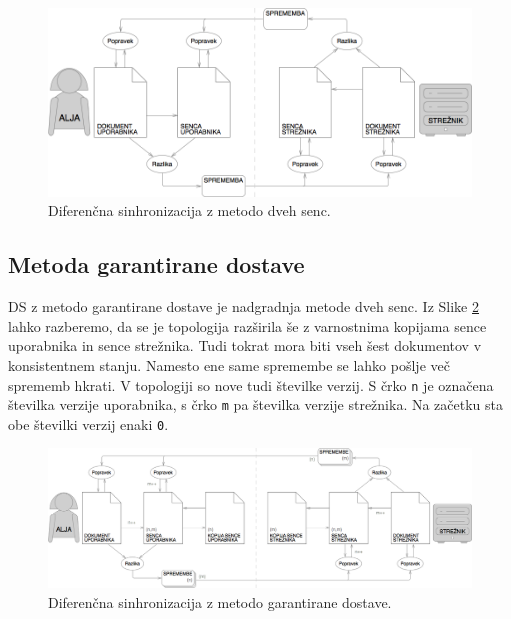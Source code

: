 \documentclass[a4paper, 12pt, twoside]{book}
\begin{document}
\begin{figure}[placement h]
\begin{center}
\includegraphics[width=11.83cm]{ds2.png}
\end{center}
\caption{Diferenčna sinhronizacija z metodo dveh senc.}
\label{ds2}
\end{figure}

\subsection{Metoda garantirane dostave}

DS z metodo garantirane dostave je nadgradnja metode dveh senc. Iz Slike \ref{ds3} lahko razberemo, da se je topologija razširila še z varnostnima kopijama sence uporabnika in sence strežnika. Tudi tokrat mora biti vseh šest dokumentov v konsistentnem stanju. Namesto ene same spremembe se lahko pošlje več sprememb hkrati. V topologiji so nove tudi številke verzij. S črko {\tt n} je označena številka verzije uporabnika, s črko {\tt m} pa številka verzije strežnika. Na začetku sta obe številki verzij enaki {\tt 0}.

\begin{figure}[placement h]
\begin{center}
\includegraphics[width=16cm]{ds3.png}
\end{center}
\caption{Diferenčna sinhronizacija z metodo garantirane dostave.}
\label{ds3}
\end{figure}
\end{document}
